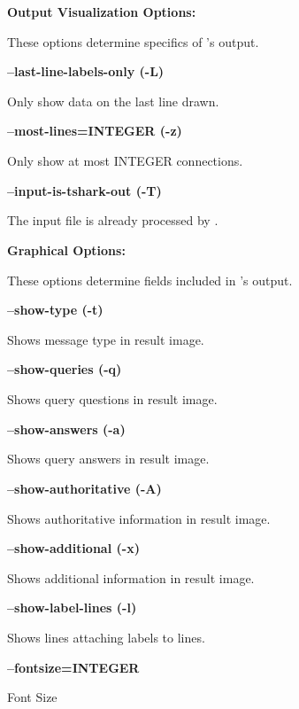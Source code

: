 {\bf Output Visualization Options:}

These options determine specifics of 's output.

\begin{description}

\item {\bf --last-line-labels-only (-L)}\verb" "

Only show data on the last line drawn.

\item {\bf --most-lines=INTEGER (-z)}\verb" "

Only show at most INTEGER connections.

\item {\bf --input-is-tshark-out (-T)}\verb" "

The input file is already processed by .

\end{description}

{\bf Graphical Options:}

These options determine fields included in 's output.

\begin{description}

\item {\bf --show-type (-t)}\verb" "

Shows message type in result image.

\item {\bf --show-queries (-q)}\verb" "

Shows query questions in result image.

\item {\bf --show-answers (-a)}\verb" "

Shows query answers in result image.

\item {\bf --show-authoritative (-A)}\verb" "

Shows authoritative information in result image.

\item {\bf --show-additional (-x)}\verb" "

Shows additional information in result image.

\item {\bf --show-label-lines (-l)}\verb" "

Shows lines attaching labels to lines.

\item {\bf --fontsize=INTEGER}\verb" "

Font Size

\end{description}

